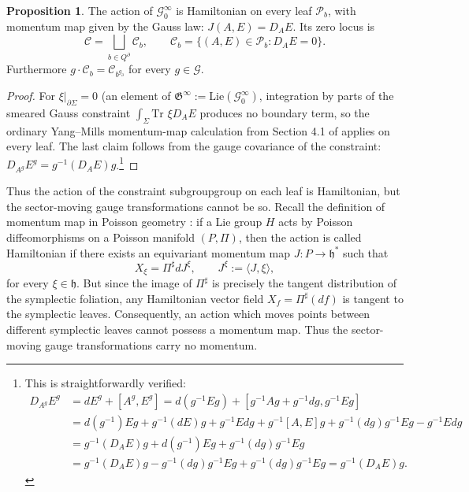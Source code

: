 \documentclass{article}
\theoremstyle{definition}
\newtheorem{proposition}[definition]{Proposition}
\begin{document}
\begin{proposition}\label{prop:allsectorGauss}
The action of \(\mathcal G_0^\infty\) is Hamiltonian on every leaf
\(\mathcal{P}_b\), with momentum map given by the Gauss law: $J(A,E)=D_AE$.
Its zero locus is
\[
\mathcal C
=
\bigsqcup_{b\in Q^\partial}\mathcal C_b,
\qquad
\mathcal C_b
=
\{(A,E)\in \mathcal{P}_b:D_AE=0\}.
\]
Furthermore $g\cdot\mathcal C_b=\mathcal C_{b^{g_\partial}}$
for every \(g\in\mathcal G\).
\end{proposition}

\begin{proof}
For \(\xi|_{\partial\Sigma}=0\) (an element of $\mathfrak G^\infty:=\text{Lie}(\mathcal{G}^\infty_0)$, integration by parts of the smeared Gauss constraint $\int_\Sigma \text{Tr }\xi D_AE$ produces no
boundary term, so the ordinary Yang--Mills momentum-map calculation from Section 4.1 of \cite{Borsboom:2025agn}
applies on every leaf. The last claim follows from the gauge covariance of the constraint: $D_{A^g}E^g=g^{-1}(D_AE)g$.\footnote{This is straightforwardly verified:
\begin{align*}
D_{A^g}E^g&=dE^g+[A^g,E^g]=d(g^{-1}Eg)+[g^{-1}Ag+g^{-1}dg,g^{-1}Eg]
\\
&=d(g^{-1})Eg+g^{-1}(dE)g+g^{-1}Edg+g^{-1}[A,E]g+g^{-1}(dg)g^{-1}Eg-g^{-1}Edg
\\
&=g^{-1}(D_AE)g+d(g^{-1})Eg+g^{-1}(dg)g^{-1}Eg
\\
&=g^{-1}(D_AE)g-g^{-1}(dg)g^{-1}Eg+g^{-1}(dg)g^{-1}Eg=g^{-1}(D_AE)g.
\end{align*}}
\end{proof}

Thus the action of the constraint subgroupgroup on each leaf is Hamiltonian, but the sector-moving gauge transformations cannot be so. Recall the definition of momentum map in Poisson geometry \cite{FernandesOrtegaRatiu2009}: if a Lie group \(H\) acts by Poisson diffeomorphisms on a Poisson
manifold \((P,\Pi)\), then the action is called Hamiltonian if there exists
an equivariant momentum map $J:P\longrightarrow\mathfrak h^*$
such that
\[
X_\xi
=
\Pi^\sharp dJ^\xi,
\qquad
J^\xi:=\langle J,\xi\rangle,
\]
for every \(\xi\in\mathfrak h\). But since the image of \(\Pi^\sharp\) is precisely the tangent distribution of
the symplectic foliation, any Hamiltonian vector field $X_f=\Pi^\sharp(df)$ is tangent to the symplectic leaves. Consequently, an action
which moves points between different symplectic leaves cannot possess a momentum map. Thus the sector-moving gauge transformations carry no momentum. 
\end{document}

